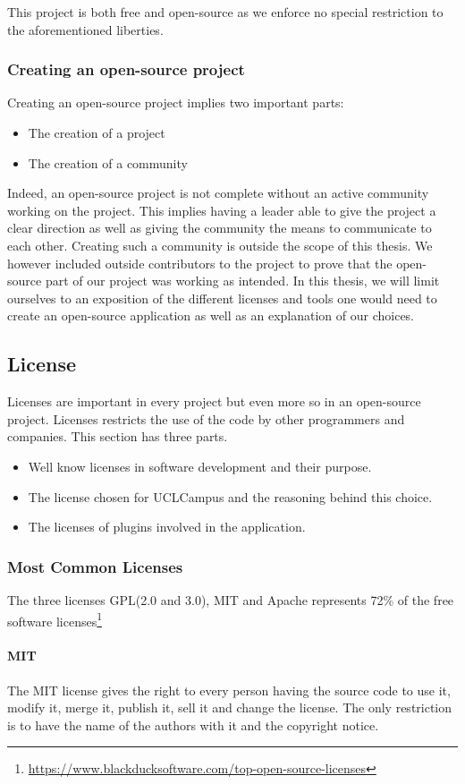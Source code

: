 \documentclass{eplmastersthesis}
\begin{document}
This project is both free and open-source as we enforce no special restriction to the aforementioned liberties.

\subsubsection{Creating an open-source project}
Creating an open-source project implies two important parts:
\begin{itemize}
\item The creation of a project
\item The creation of a community
\end{itemize}

Indeed, an open-source project is not complete without an active community working on the project. This implies having a leader able to give the project a clear direction as well as giving the community the means to communicate to each other. Creating such a community is outside the scope of this thesis. We however included outside contributors to the project to prove that the open-source part of our project was working as intended. In this thesis, we will limit ourselves to an exposition of the different licenses and tools one would need to create an open-source application as well as an explanation of our choices. 

\subsection{License}
Licenses are important in every project but even more so in an open-source project. Licenses restricts the use of the code by other programmers and companies. This section has three parts.
\begin{itemize}
\item Well know licenses in software development and their purpose.
\item The license chosen for UCLCampus and the reasoning behind this choice.
\item The licenses of plugins involved in the application.
\end{itemize}
\subsubsection{Most Common Licenses}
The three licenses GPL(2.0 and 3.0), MIT and Apache represents 72\% of the free software licenses\footnote{\url{https://www.blackducksoftware.com/top-open-source-licenses}}
\paragraph{MIT}
The MIT license gives the right to every person having the source code to use it, modify it, merge it, publish it, sell it and change the license. The only restriction is to have the name of the authors with it and the copyright notice.
\end{document}
